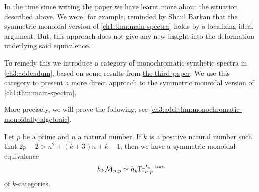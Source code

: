 \begin{addendum}
    \label{ch1:add:shaul-comment-monoidal}
    In the time since writing the paper we have learnt more about the situation described above. We were, for example, reminded by Shaul Barkan that the symmetric monoidal version of \cref{ch1:thm:main-spectra} holds by a localizing ideal argument. But, this approach does not give any new insight into the deformation underlying said equivalence. 

    To remedy this we introduce a category of monochromatic synthetic spectra in \cref{ch3:addendum}, based on some results from \hyperref[ch3]{the third paper}. We use this category to present a more direct approach to the symmetric monoidal version of \cref{ch1:thm:main-spectra}. 
\end{addendum}

More precisely, we will prove the following, see \cref{ch3:add:thm:monochromatic-monoidally-algebraic}. 

\begin{theorem}
    \label{ch1:conj:monochromatic-monoidally-algebraic}
    Let $p$ be a prime and $n$ a natural number. If $k$ is a positive natural number such that $2p-2>n^2+(k+3)n+k-1$, then we have a symmetric monoidal equivalence 
    \[h_k \mathcal{M}_{n,p}\simeq h_k \mathrm{Fr}_{n,p}^{I_n-\mathrm{tors}}\]
    of $k$-categories. 
\end{theorem}




 

    

